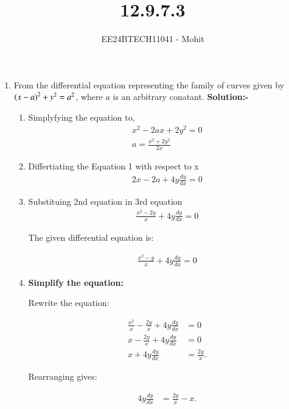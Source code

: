 \documentclass[journal]{IEEEtran}
\numberwithin{equation}{enumi}
\numberwithin{figure}{enumi}
\begin{document}

\title{12.9.7.3}
\author{EE24BTECH11041 - Mohit}
{\let\newpage\relax\maketitle}
\begin{enumerate}
	\item From the differential equation representing the family of curves given by $\left(x-a\right)^2 + y^2 = a^2$, where $a$ is an arbitrary conatant.
\textbf{Solution:-}\\
\begin{enumerate}
\item Simplyfying the equation to,
\begin{align}
x^2-2ax+2y^2=0\\
a = \frac{x^2+2y^2}{2x}
\end{align}
\item Differtiating the Equation 1 with respect to x
\begin{align}
	2x-2a+4y\frac{dy}{dx}=0
\end{align}
\item Substituing 2nd equation in 3rd equation
\begin{align}
	\frac{x^2-2y}{x} + 4y\frac{dy}{dx} = 0	
\end{align}



The given differential equation is:

\begin{align}
\frac{x^2 - y}{x} + 4y \frac{dy}{dx} = 0
\end{align}


\item \textbf{Simplify the equation:}

Rewrite the equation:

\begin{align}
\frac{x^2}{x} - \frac{2y}{x} + 4y \frac{dy}{dx} &= 0 \\
x - \frac{2y}{x} + 4y \frac{dy}{dx} &= 0 \\
x + 4y \frac{dy}{dx} &= \frac{2y}{x}.
\end{align}

Rearranging gives:

\begin{align}
4y \frac{dy}{dx} &= \frac{2y}{x} - x.
\end{align}


\end{enumerate}
\end{enumerate}
\end{document}
